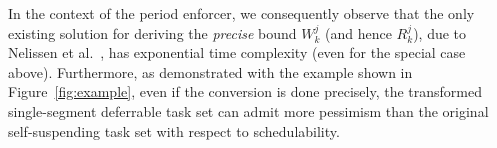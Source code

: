 In the context of the period enforcer, we consequently observe that the only existing solution for deriving the \emph{precise} bound $W_k^{j}$ (and hence $R_k^j$), due to Nelissen et al.\ \cite{ecrts15nelissen},  has exponential time complexity (even for the special case above). Furthermore, as demonstrated with the example shown in Figure~\ref{fig:example}, even if the conversion is done precisely, the transformed single-segment deferrable task set can admit more pessimism than the original self-suspending task set with respect to schedulability.
